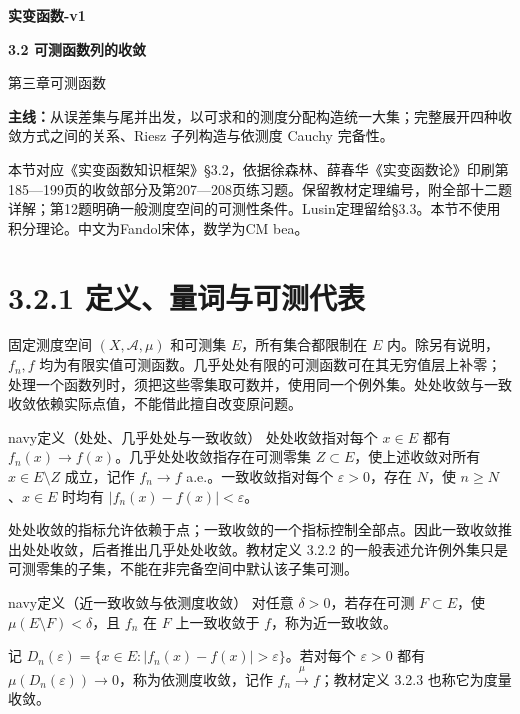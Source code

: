 \documentclass[11pt,a4paper]{article}
\begin{document}
\begin{center}{\LARGE\bfseries 实变函数-v1\par}\vspace{7pt}
{\Large\bfseries 3.2 可测函数列的收敛\par}\vspace{6pt}
{第三章\quad 可测函数\par}\end{center}
\textbf{主线：}从误差集与尾并出发，以可求和的测度分配构造统一大集；完整展开四种收敛方式之间的关系、Riesz 子列构造与依测度 Cauchy 完备性。

本节对应《实变函数知识框架》\S3.2，依据徐森林、薛春华《实变函数论》印刷第185—199页的收敛部分及第207—208页练习题。保留教材定理编号，附全部十二题详解；第12题明确一般测度空间的可测性条件。Lusin定理留给\S3.3。本节不使用积分理论。中文为Fandol宋体，数学为CM bea。
\begingroup\small\setlength{\parskip}{0pt}\tableofcontents\endgroup
\newpage
{}\section[\S{}3.2.1
定义、量词与可测代表]{3.2.1
定义、量词与可测代表}\label{ux5b9aux4e49ux91cfux8bcdux4e0eux53efux6d4bux4ee3ux8868}

固定测度空间 \((X,\mathcal A,\mu)\) 和可测集 \(E\)，所有集合都限制在
\(E\) 内。除另有说明，\(f_n,f\)
均为有限实值可测函数。几乎处处有限的可测函数可在其无穷值层上补零；处理一个函数列时，须把这些零集取可数并，使用同一个例外集。处处收敛与一致收敛依赖实际点值，不能借此擅自改变原问题。

\begin{sboxenv}{navy}{定义（处处、几乎处处与一致收敛）}
处处收敛指对每个 \(x\in E\) 都有
\(f_n(x)\to f(x)\)。几乎处处收敛指存在可测零集
\(Z\subset E\)，使上述收敛对所有 \(x\in E\setminus Z\) 成立，记作
\(f_n\to f\) a.e.。一致收敛指对每个 \(\varepsilon>0\)，存在 \(N\)，使
\(n\ge N\)、\(x\in E\) 时均有 \(|f_n(x)-f(x)|<\varepsilon\)。

\end{sboxenv}

处处收敛的指标允许依赖于点；一致收敛的一个指标控制全部点。因此一致收敛推出处处收敛，后者推出几乎处处收敛。教材定义
3.2.2
的一般表述允许例外集只是可测零集的子集，不能在非完备空间中默认该子集可测。

\begin{sboxenv}{navy}{定义（近一致收敛与依测度收敛）}
对任意 \(\delta>0\)，若存在可测 \(F\subset E\)，使
\(\mu(E\setminus F)<\delta\)，且 \(f_n\) 在 \(F\) 上一致收敛于
\(f\)，称为近一致收敛。

记 \(D_n(\varepsilon)=\{x\in E:|f_n(x)-f(x)|>\varepsilon\}\)。若对每个
\(\varepsilon>0\) 都有
\(\mu(D_n(\varepsilon))\to0\)，称为依测度收敛，记作
\(f_n\xrightarrow{\mu}f\)；教材定义 3.2.3 也称它为度量收敛。

\end{sboxenv}
\end{document}
